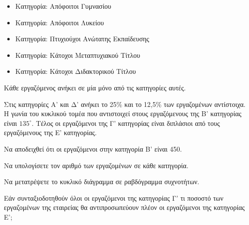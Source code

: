 \begin{itemize}
    \item[Α'] Κατηγορία: Απόφοιτοι Γυμνασίου
    \item[Β'] Κατηγορία: Απόφοιτοι Λυκείου
    \item[Γ'] Κατηγορία: Πτυχιούχοι Ανώτατης Εκπαίδευσης
    \item[Δ'] Κατηγορία: Κάτοχοι Μεταπτυχιακού Τίτλου
    \item[Ε'] Κατηγορία: Κάτοχοι Διδακτορικού Τίτλου
\end{itemize}

Κάθε εργαζόμενος ανήκει σε μία μόνο από τις κατηγορίες αυτές.

Στις κατηγορίες Α' και Δ' ανήκει το 25\% και το 12,5\% των εργαζομένων αντίστοιχα.
Η γωνία του κυκλικού τομέα που αντιστοιχεί στους εργαζόμενους της Β' κατηγορίας είναι $135^\circ$.
Τέλος οι εργαζόμενοι της Γ' κατηγορίας είναι διπλάσιοι από τους εργαζόμενους της Ε' κατηγορίας.

\begin{alist}
    \item Να αποδειχθεί ότι οι εργαζόμενοι στην κατηγορία Β' είναι 450. 
    \item Να υπολογίσετε τον αριθμό των εργαζομένων σε κάθε κατηγορία. 
    \item
    \begin{rlist}
        \item Να μετατρέψετε το κυκλικό διάγραμμα σε ραβδόγραμμα συχνοτήτων. 
        \item Εάν συνταξιοδοτηθούν όλοι οι εργαζόμενοι της κατηγορίας Γ' τι ποσοστό των εργαζομένων της εταιρείας θα αντιπροσωπεύουν πλέον οι εργαζόμενοι της κατηγορίας Ε'; 
    \end{rlist}
\end{alist}


